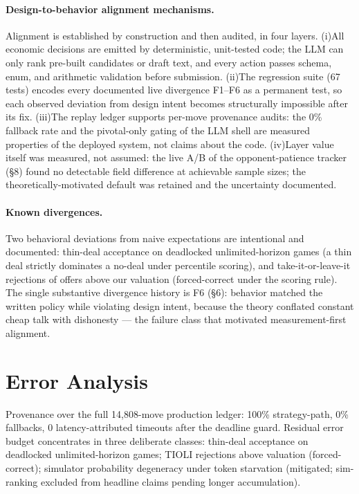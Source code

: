 \documentclass[11pt]{article}
\begin{document}
\paragraph{Design-to-behavior alignment mechanisms.}
Alignment is established by construction and then audited, in four layers. (i)\;All economic decisions are emitted by deterministic, unit-tested code; the LLM can only rank pre-built candidates or draft text, and every action passes schema, enum, and arithmetic validation before submission. (ii)\;The regression suite (67 tests) encodes every documented live divergence F1--F6 as a permanent test, so each observed deviation from design intent becomes structurally impossible after its fix. (iii)\;The replay ledger supports per-move provenance audits: the 0\% fallback rate and the pivotal-only gating of the LLM shell are measured properties of the deployed system, not claims about the code. (iv)\;Layer value itself was measured, not assumed: the live A/B of the opponent-patience tracker (\S8) found no detectable field difference at achievable sample sizes; the theoretically-motivated default was retained and the uncertainty documented.

\paragraph{Known divergences.}
Two behavioral deviations from naive expectations are intentional and documented: thin-deal acceptance on deadlocked unlimited-horizon games (a thin deal strictly dominates a no-deal under percentile scoring), and take-it-or-leave-it rejections of offers above our valuation (forced-correct under the scoring rule). The single substantive divergence history is F6 (\S6): behavior matched the written policy while violating design intent, because the theory conflated constant cheap talk with dishonesty --- the failure class that motivated measurement-first alignment.

\section{Error Analysis}
Provenance over the full 14{,}808-move production ledger: 100\% strategy-path, 0\% fallbacks, 0 latency-attributed timeouts after the deadline guard. Residual error budget concentrates in three deliberate classes: thin-deal acceptance on deadlocked unlimited-horizon games; TIOLI rejections above valuation (forced-correct); simulator probability degeneracy under token starvation (mitigated; sim-ranking excluded from headline claims pending longer accumulation).
\end{document}
